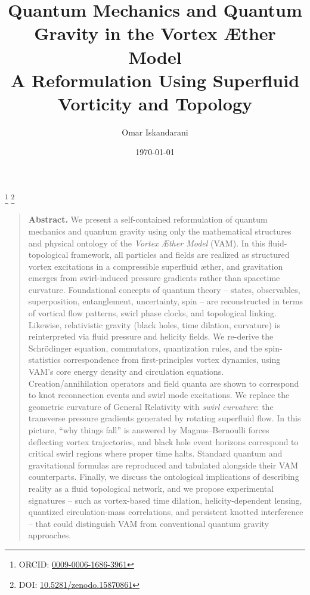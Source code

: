 \documentclass[a4paper,12pt]{article}
\begin{document}
        \title{Quantum Mechanics and Quantum Gravity in the Vortex Æther Model\\
        {\large A Reformulation Using Superfluid Vorticity and Topology}}
        \author{Omar Iskandarani}
        \thanks{ORCID: \href{https://orcid.org/0009-0006-1686-3961}{0009-0006-1686-3961}}
        \thanks{DOI: \href{https://doi.org/10.5281/zenodo.15870861}{10.5281/zenodo.15870861}}
        \date{\today}
        \maketitle
        \begin{quotation}
            \noindent\textbf{Abstract.}
                We present a self-contained reformulation of quantum mechanics and quantum gravity using only the mathematical structures and physical ontology of the \emph{Vortex Æther Model} (VAM). In this fluid-topological framework, all particles and fields are realized as structured vortex excitations in a compressible superfluid æther, and gravitation emerges from swirl-induced pressure gradients rather than spacetime curvature. Foundational concepts of quantum theory -- states, observables, superposition, entanglement, uncertainty, spin -- are reconstructed in terms of vortical flow patterns, swirl phase clocks, and topological linking. Likewise, relativistic gravity (black holes, time dilation, curvature) is reinterpreted via fluid pressure and helicity fields. We re-derive the Schrödinger equation, commutators, quantization rules, and the spin-statistics correspondence from first-principles vortex dynamics, using VAM's core energy density and circulation equations. Creation/annihilation operators and field quanta are shown to correspond to knot reconnection events and swirl mode excitations.  We replace the geometric curvature of General Relativity with \emph{swirl curvature}: the transverse pressure gradients generated by rotating superfluid flow.  In this picture, ``why things fall'' is answered by Magnus–Bernoulli forces deflecting vortex trajectories, and black hole event horizons correspond to critical swirl regions where proper time halts. Standard quantum and gravitational formulas are reproduced and tabulated alongside their VAM counterparts. Finally, we discuss the ontological implications of describing reality as a fluid topological network, and we propose experimental signatures -- such as vortex-based time dilation, helicity-dependent lensing, quantized circulation-mass correlations, and persistent knotted interference -- that could distinguish VAM from conventional quantum gravity approaches.
        \end{quotation}
\end{document}

